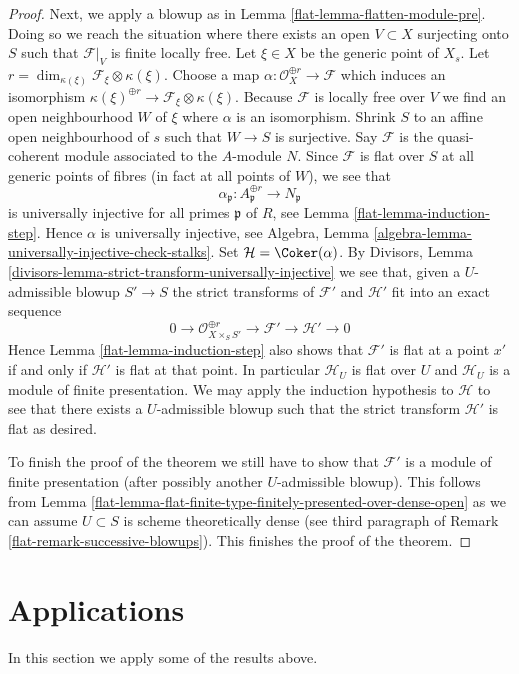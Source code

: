 \begin{proof}
\medskip\noindent
Next, we apply a blowup as in Lemma \ref{flat-lemma-flatten-module-pre}.
Doing so we reach the situation where there exists an
open $V \subset X$ surjecting onto $S$ such that $\mathcal{F}|_V$
is finite locally free. Let $\xi \in X$ be the generic point of $X_s$. Let
$r = \dim_{\kappa(\xi)} \mathcal{F}_\xi \otimes \kappa(\xi)$.
Choose a map $\alpha : \mathcal{O}_X^{\oplus r} \to \mathcal{F}$
which induces an isomorphism
$\kappa(\xi)^{\oplus r} \to \mathcal{F}_\xi \otimes \kappa(\xi)$.
Because $\mathcal{F}$ is locally free over $V$ we find an open neighbourhood
$W$ of $\xi$ where $\alpha$ is an isomorphism. Shrink $S$ to an affine open
neighbourhood of $s$ such that $W \to S$ is surjective. Say $\mathcal{F}$
is the quasi-coherent module associated to the $A$-module $N$. Since
$\mathcal{F}$ is flat over $S$ at all generic points of fibres
(in fact at all points of $W$), we see that
$$
\alpha_\mathfrak p : A_\mathfrak p^{\oplus r} \to N_\mathfrak p
$$
is universally injective for all primes $\mathfrak p$ of $R$, see
Lemma \ref{flat-lemma-induction-step}. Hence $\alpha$ is universally injective,
see Algebra, Lemma \ref{algebra-lemma-universally-injective-check-stalks}.
Set $\mathcal{H} = \Coker(\alpha)$.
By Divisors, Lemma \ref{divisors-lemma-strict-transform-universally-injective}
we see that, given a $U$-admissible blowup $S' \to S$
the strict transforms of $\mathcal{F}'$ and $\mathcal{H}'$
fit into an exact sequence
$$
0 \to \mathcal{O}_{X \times_S S'}^{\oplus r} \to \mathcal{F}'
\to \mathcal{H}' \to 0
$$
Hence Lemma \ref{flat-lemma-induction-step} also shows that $\mathcal{F}'$
is flat at a point $x'$ if and only if
$\mathcal{H}'$ is flat at that point. In particular $\mathcal{H}_U$ is
flat over $U$ and $\mathcal{H}_U$ is a module of finite presentation.
We may apply the induction hypothesis to $\mathcal{H}$ to see that
there exists a $U$-admissible blowup such that the strict transform
$\mathcal{H}'$ is flat as desired.

\medskip\noindent
To finish the proof of the theorem we still have to show that $\mathcal{F}'$
is a module of finite presentation (after possibly another
$U$-admissible blowup). This follows from
Lemma \ref{flat-lemma-flat-finite-type-finitely-presented-over-dense-open}
as we can assume $U \subset S$ is scheme theoretically dense (see
third paragraph of Remark \ref{flat-remark-successive-blowups}).
This finishes the proof of the theorem.
\end{proof}

\section{Applications}
\label{flat-section-applications}
In this section we apply some of the results above.

